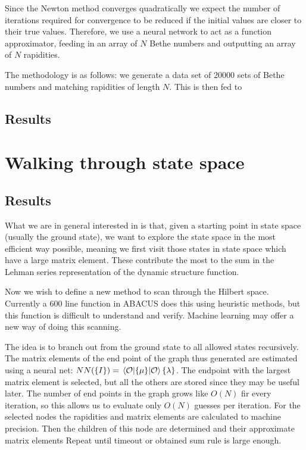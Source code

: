 \documentclass[11pt, a4paper]{report} %
\begin{document}
Since the Newton method converges quadratically we expect the number of iterations required for convergence to be reduced if the initial values are closer to their true values.
Therefore, we use a neural network to act as a function approximator, feeding in an array of \(N\) Bethe numbers and outputting an array of \(N\) rapidities.

The methodology is as follows: we generate a data set of 20000 sets of Bethe numbers and matching rapidities of length \(N\).
This is then fed to

\subsection{Results}

\section{Walking through state space}

\subsection{Results}

What we are in general interested in is that, given a starting point in state space (usually the ground state), we want to explore the state space in the most efficient way possible, meaning we first visit those states in state space which have a large matrix element. 
These contribute the most to the sum in the Lehman series representation of the dynamic structure function.





Now we wish to define a new method to scan through the Hilbert space.
Currently a 600 line function in ABACUS does this using heuristic methods, but this function is difficult to understand and verify.
Machine learning may offer a new way of doing this scanning.

The idea is to branch out from the ground state to all allowed states recursively.
The matrix elements of the end point of the graph thus generated are estimated using a neural net: $NN(\{I\}) = \expval{\{\mu\}}{\mathcal{O}}{\{\lambda\}}$.
The endpoint with the largest matrix element is selected, but all the others are stored since they may be useful later.
The number of end points in the graph grows like $O(N)$ fir every iteration, so this allows us to evaluate only $O(N)$ guesses per iteration.
For the selected nodes the rapidities and matrix elements are calculated to machine precision.
Then the children of this node are determined and their approximate matrix elements
Repeat until timeout or obtained sum rule is large enough.
\end{document}

